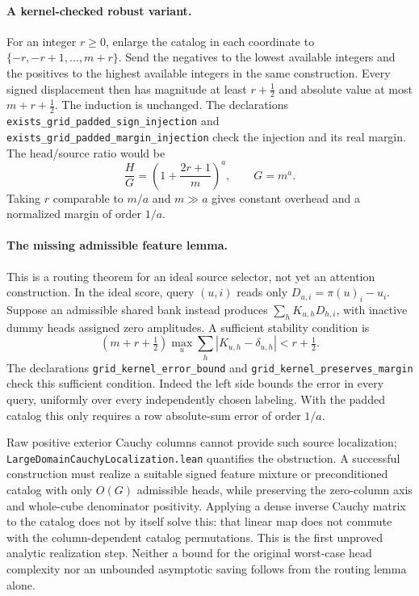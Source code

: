 \documentclass{article}
\begin{document}
\paragraph{A kernel-checked robust variant.}
For an integer $r\geq0$, enlarge the catalog in each coordinate to
$\{-r,-r+1,\ldots,m+r\}$. Send the negatives to the lowest available integers
and the positives to the highest available integers in the same construction.
Every signed displacement then has magnitude at least $r+\tfrac12$ and absolute
value at most $m+r+\tfrac12$. The induction is unchanged. The declarations \texttt{exists\_grid\_padded\_sign\_injection} and \texttt{exists\_grid\_padded\_margin\_injection} check the injection and its real margin. The head/source ratio
would be
\[
 \frac{H}{G}=\left(1+\frac{2r+1}{m}\right)^a,
 \qquad G=m^a.
\]
Taking $r$ comparable to $m/a$ and $m\gg a$ gives constant overhead and a
normalized margin of order $1/a$.

\paragraph{The missing admissible feature lemma.}
This is a routing theorem for an ideal source selector, not yet an attention
construction. In the ideal score, query $(u,i)$ reads only
$D_{u,i}=\pi(u)_i-u_i$. Suppose an admissible shared bank instead produces
$\sum_h K_{u,h}D_{h,i}$, with inactive dummy heads assigned zero amplitudes.
A sufficient stability condition is
\[
 (m+r+\tfrac12)\max_u\sum_h|K_{u,h}-\delta_{u,h}|
 <r+\tfrac12.
\]
The declarations \texttt{grid\_kernel\_error\_bound} and \texttt{grid\_kernel\_preserves\_margin} check this sufficient condition. Indeed the left side bounds the error in every query, uniformly over every
independently chosen labeling. With the padded catalog this only requires a
row absolute-sum error of order $1/a$.

Raw positive exterior Cauchy columns cannot provide such source localization;
\texttt{LargeDomainCauchyLocalization.lean} quantifies the obstruction. A
successful construction must realize a suitable signed feature mixture or
preconditioned catalog with only $O(G)$ admissible heads, while preserving the
zero-column axis and whole-cube denominator positivity. Applying a dense inverse
Cauchy matrix to the catalog does not by itself solve this: that linear map does
not commute with the column-dependent catalog permutations. This is the first
unproved analytic realization step. Neither a bound for the original worst-case
head complexity nor an unbounded asymptotic saving follows from the routing
lemma alone.
\end{document}
